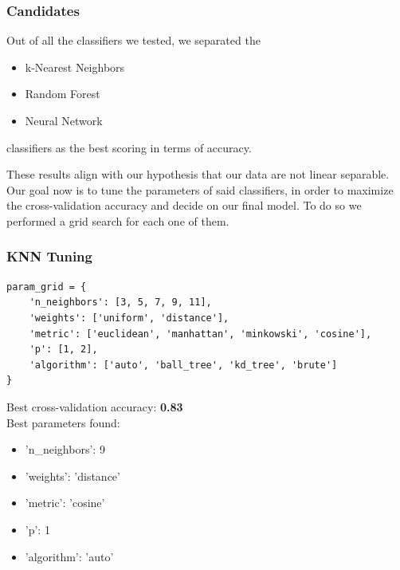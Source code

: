 \documentclass{beamer}
\begin{document}
\begin{frame}
\frametitle{Candidates}
Out of all the classifiers we tested, we separated the
\begin{itemize}
    \item k-Nearest Neighbors
    \item Random Forest 
    \item Neural Network
\end{itemize} 
classifiers as the best scoring in terms of accuracy. \vspace{0.5cm}

These results align with our hypothesis that our data are not linear separable. Our goal now is to tune the parameters of said classifiers, in order to maximize the cross-validation accuracy and decide on our final model. To do so we performed a grid search for each one of them.
\end{frame}

\begin{frame}[fragile]
\frametitle{KNN Tuning}
\lstset{style=PythonStyle}
\begin{lstlisting}
param_grid = {
    'n_neighbors': [3, 5, 7, 9, 11],
    'weights': ['uniform', 'distance'],
    'metric': ['euclidean', 'manhattan', 'minkowski', 'cosine'],
    'p': [1, 2],
    'algorithm': ['auto', 'ball_tree', 'kd_tree', 'brute']
}
\end{lstlisting}
Best cross-validation accuracy: \textbf{0.83} \\
Best parameters found: 
\begin{itemize}
    \item 'n\_neighbors': 9
    \item 'weights': 'distance'
    \item 'metric': 'cosine'
    \item 'p': 1
    \item 'algorithm': 'auto'
\end{itemize}
\end{frame}
\end{document}
